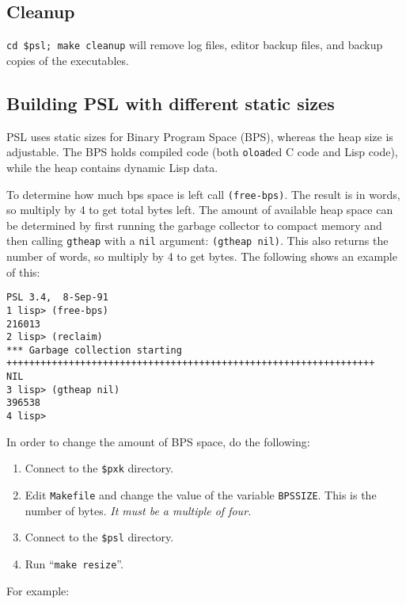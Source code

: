 \subsection{Cleanup}

{\tt cd \$psl; make cleanup} will remove log files, editor backup files, and
backup copies of the executables.

\subsection{Building PSL with different static sizes}

PSL uses static sizes for Binary Program Space (BPS), whereas the heap
size is adjustable.
The BPS holds compiled code (both {\tt oload}ed C code and Lisp code),
while the heap contains dynamic Lisp data.

To determine how much bps space is left call {\tt (free-bps)}.  The
result is in words, so multiply by 4 to get total bytes left.  The
amount of available heap space can be determined by first running the
garbage collector to compact memory and then calling {\tt gtheap}
with a {\tt nil} argument: {\tt (gtheap nil)}.  This also returns the
number of words, so multiply by 4 to get bytes.  The following shows
an example of this:

\begin{verbatim}
PSL 3.4,  8-Sep-91
1 lisp> (free-bps)
216013
2 lisp> (reclaim)
*** Garbage collection starting
+++++++++++++++++++++++++++++++++++++++++++++++++++++++++++++++++
NIL
3 lisp> (gtheap nil)
396538
4 lisp> 
\end{verbatim}

In order to change the amount of BPS space, do the following:

\begin{enumerate}

\item Connect to the {\tt \$pxk} directory.

\item Edit {\tt Makefile} and change the value of the variable
{\tt BPSSIZE}.  This is the number of bytes. {\it It must be a
multiple of four.}

\item Connect to the {\tt \$psl} directory.

\item Run ``{\tt make resize}''.

\end{enumerate}

\noindent For example:

